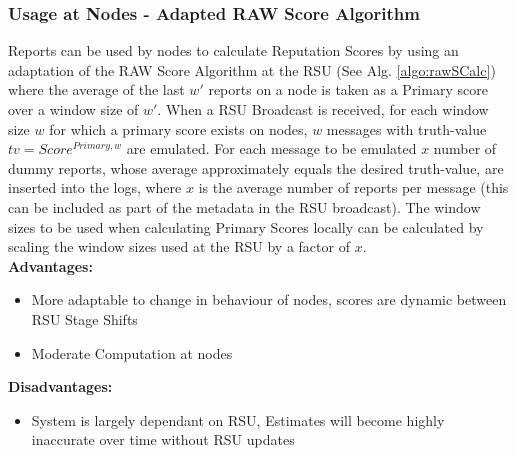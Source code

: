 \documentclass[journal]{IEEEtran}
\begin{document}
\subsubsection{Usage at Nodes - Adapted RAW Score Algorithm}
\label{sec:PM:usage:raw@node}
Reports can be used by nodes to calculate Reputation Scores by using an adaptation of the RAW Score Algorithm at the RSU (See Alg. \ref{algo:rawSCalc}) where the average of the last $ w' $ reports on a node is taken as a Primary score over a window size of $ w' $. When a RSU Broadcast is received, for each window size $ w $ for which a primary score exists on nodes, $ w $ messages with truth-value $ tv = Score^{Primary,w} $ are emulated. For each message to be emulated $ x $ number of dummy reports, whose average approximately equals the desired truth-value, are inserted into the logs, where $ x $ is the average number of reports per message (this can be included as part of the metadata in the RSU broadcast). The window sizes to be used when calculating Primary Scores locally can be calculated by scaling the window sizes used at the RSU by a factor of $ x $.\\
\textbf{Advantages:}
	\begin{itemize}
		\item More adaptable to change in behaviour of nodes, scores are dynamic between RSU Stage Shifts
		\item Moderate Computation at nodes
	\end{itemize}
\textbf{Disadvantages:} 
	\begin{itemize}
		\item System is largely dependant on RSU, Estimates will become highly inaccurate over time without RSU updates
	\end{itemize}
\end{document}
